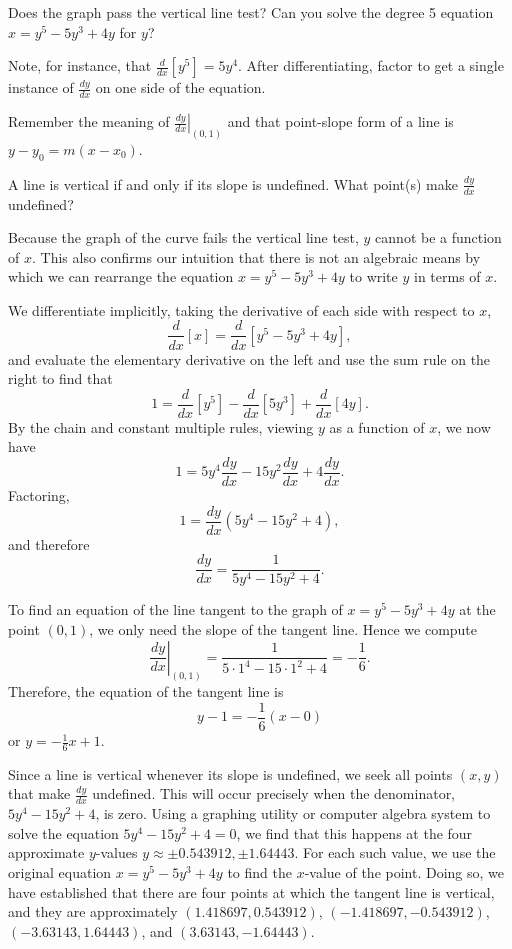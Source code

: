 \begin{bighint}
\ba
	\item Does the graph pass the vertical line test?  Can you solve the degree 5 equation $x = y^5 - 5y^3 + 4y$ for $y$?
	\item Note, for instance, that $\frac{d}{dx}[y^5] = 5y^4$.  After differentiating, factor to get a single instance of $\frac{dy}{dx}$ on one side of the equation.
	\item Remember the meaning of $\left. \frac{dy}{dx} \right|_{(0,1)}$ and that point-slope form of a line is $y - y_0 = m(x-x_0)$.
	\item A line is vertical if and only if its slope is undefined.  What point(s) make $\frac{dy}{dx}$ undefined?
\ea
\end{bighint}
\begin{activitySolution}
\ba
	\item Because the graph of the curve fails the vertical line test, $y$ cannot be a function of $x$.  This also confirms our intuition that there is not an algebraic means by which we can rearrange the equation $x = y^5 - 5y^3 + 4y$ to write $y$ in terms of $x$.
	\item We differentiate implicitly, taking the derivative of each side with respect to $x$,
	$$\frac{d}{dx}[x ]= \frac{d}{dx}[y^5 - 5y^3 + 4y],$$
	and evaluate the elementary derivative on the left and use the sum rule on the right to find that
	$$1 = \frac{d}{dx}[y^5] - \frac{d}{dx}[5y^3] + \frac{d}{dx}[4y].$$
	By the chain and constant multiple rules, viewing $y$ as a function of $x$, we now have
	$$1 = 5y^4\frac{dy}{dx} - 15y^2\frac{dy}{dx} + 4\frac{dy}{dx}.$$
	Factoring,
	$$1 = \frac{dy}{dx}(5y^4 - 15y^2 + 4),$$
	and therefore
	$$\frac{dy}{dx} = \frac{1}{5y^4 - 15y^2 + 4}.$$
	\item To find an equation of the line tangent to the graph of $x = y^5 - 5y^3 + 4y$ at the point $(0, 1)$, we only need the slope of the tangent line.  Hence we compute 
	$$\left. \frac{dy}{dx} \right|_{(0,1)} = \frac{1}{5 \cdot 1^4 - 15 \cdot 1^2 + 4} = -\frac{1}{6}.$$
	Therefore, the equation of the tangent line is
	$$y - 1 = -\frac{1}{6}(x-0)$$
	or $y = -\frac{1}{6}x + 1$.
	\item Since a line is vertical whenever its slope is undefined, we seek all points $(x,y)$ that make $\frac{dy}{dx}$ undefined.  This will occur precisely when the denominator, $5y^4 - 15y^2 + 4$, is zero.  Using a graphing utility or computer algebra system to solve the equation $5y^4 - 15y^2 + 4 = 0$, we find that this happens at the four approximate $y$-values $y \approx \pm 0.543912, \pm 1.64443$.  For each such value, we use the original equation $x = y^5 - 5y^3 + 4y$ to find the $x$-value of the point.  Doing so, we have established that there are four points at which the tangent line is vertical, and they are approximately $(1.418697,0.543912)$, $(-1.418697,-0.543912)$, $(-3.63143, 1.64443)$, and $(3.63143, -1.64443)$. 
\ea
\end{activitySolution}
\aftera